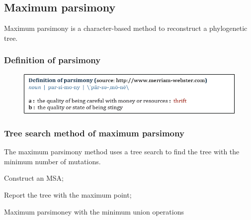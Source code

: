 %
%

%
%
\subsection{Maximum parsimony}
Maximum parsimony is a character-based method to reconstruct a phylogenetic tree. 

%
%
\subsubsection*{Definition of parsimony}
\begin{figure}[H]
  \centering
      \includegraphics[width=0.7 \textwidth]{fig09/parsimony.png}
\end{figure}

%
%
\subsubsection*{Tree search method of maximum parsimony}
The maximum parsimony method uses a tree search to find the tree with the minimum number of mutations. \\

\begin{algorithm}[H]    
  \BlankLine
  Construct an MSA;
  \BlankLine
    
  
  \BlankLine
  Report the tree with the maximum point;
   \BlankLine
    
  \caption{Maximum parsimoney with the minimum union operations}

\end{algorithm}

